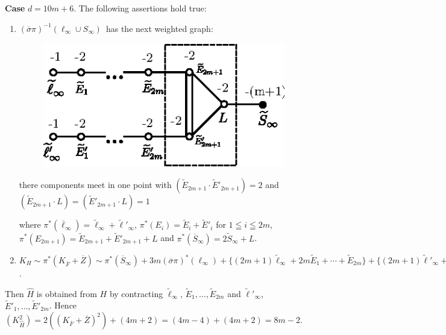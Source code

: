 \subsubsection{}\label{chap3:3.6.5}
{\bf Case} $d=10m+6$. The following assertions hold true:
\begin{enumerate}
\renewcommand{\labelenumi}{(\theenumi)}
\item $(\overline{\sigma}\pi)^{-1}(\ell_{\infty}\cup
  S_{\infty})$\pageoriginale\ has the next weighted graph:
\begin{figure}[H]
\centering
\includegraphics[scale=1.3]{figures/miyansi_fig48.eps}
\end{figure}
\noindent
there components meet in one point with $(\tilde{E}_{2m+1} \cdot
\tilde{E}'_{2m+1})=2$ and $(\tilde{E}_{2m+1} \cdot L) =
(\tilde{E}'_{2m+1}\cdot L)=1$

\noindent
where
$\pi^{\ast}(\overline{\ell}_{\infty})=\widetilde{\ell}_{\infty}+\widetilde{\ell}'_{\infty}$,
$\pi^{\ast}(E_{i})=\widetilde{E}_{i}+\widetilde{E}'_{i}$ for $1\leqq
i\leqq 2m$,
$\pi^{\ast}(E_{2m+1})=\widetilde{E}_{2m+1}+\widetilde{E}'_{2m+1}+L$
and $\pi^{\ast}(\overline{S}_{\infty})=2\widetilde{S}_{\infty}+L$. 

\item $K_{H}\sim \pi^{\ast}(K_{\overline{F}}+\overline{Z})\sim
  \pi^{\ast}(\overline{S}_{\infty})+3m(\overline{\sigma}\pi)^{\ast}(\ell_{\infty})+\{(2m+1)\widetilde{\ell}_{\infty}+2m\widetilde{E}_{1}+\cdots+\widetilde{E}_{2m}\}+\{(2m+1)\widetilde{\ell}'_{\infty}+2m\widetilde{E}'_{1}+\cdots+\widetilde{E}'_{2m}\}$. 
\end{enumerate}

Then $\widehat{H}$ is obtained from $H$ by contracting
$\widetilde{\ell}_{\infty}$,
$\widetilde{E}_{1},\ldots,\widetilde{E}_{2m}$ and
$\widetilde{\ell}'_{\infty}$,
$\widetilde{E}'_{1},\ldots,\widetilde{E}'_{2m}$. Hence
$(K^{2}_{\widehat{H}})=2((K_{\overline{F}}+\overline{Z})^{2})+(4m+2)=(4m-4)+(4m+2)=8m-2$. 

